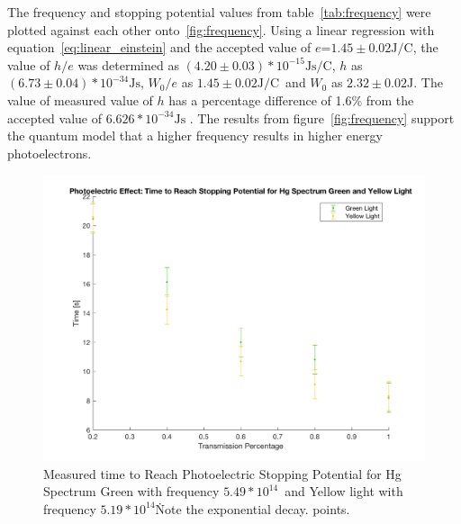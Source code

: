 \documentclass[]{article}
\newcommand{\hVal}{ $6.626 * 10^{-34}\si{\joule\second}$ }
\newcommand{\yellowFreq}{$5.19 * 10^{14}$}
\newcommand{\greenFreq}{$5.49 * 10^{14}$}
\newcommand{\he}{$(4.20 \pm 0.03) * 10^{-15} \si{\joule\second\per\coulomb}$}
\newcommand{\hMeasured}{$(6.73 \pm 0.04) * 10^{-34} \si{\joule\second}$}
\newcommand{\we}{$1.45 \pm 0.02 \si{\joule\per\coulomb}$}
\newcommand{\wMeasured}{$2.32 \pm 0.02 \si{\joule}$}
\begin{document}
The frequency and stopping potential values from table~\ref{tab:frequency} were
plotted against each other onto~\ref{fig:frequency}. Using a linear regression
with equation~\ref{eq:linear_einstein} and the accepted value of $e$=\we, the
value of $h/e$ was determined as \he, $h$ as \hMeasured, $W_0/e$ as \we\ and
$W_0$ as \wMeasured. The value of measured value of $h$ has a percentage
difference of 1.6\% from the accepted value of \hVal. The results from
figure~\ref{fig:frequency} support the quantum model that a higher frequency
results in higher energy photoelectrons.

\newpage
\begin{figure}[H]
    \includegraphics[width=\textwidth]{../img/exponential.png}
    \caption{Measured time to Reach Photoelectric Stopping Potential for Hg
    Spectrum Green with frequency \greenFreq\ and Yellow light with frequency
    \yellowFreq\. Note the exponential decay.
    points.}\label{fig:exponential}
\end{figure}

\newpage
\end{document}

